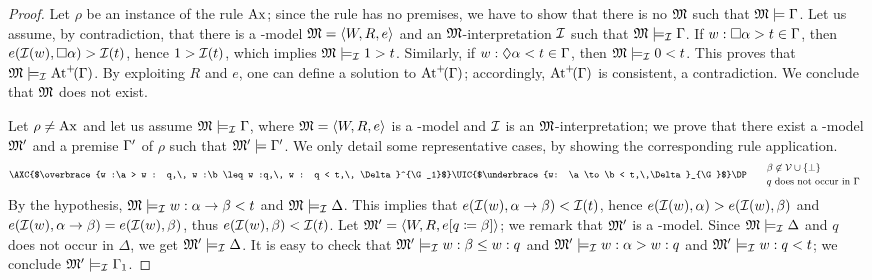 \begin{proof}
  Let $\rho$ be an instance of the rule $\mathrm{Ax}$; since the rule has no premises,
  we have to show that there is no $\mathfrak{M}$ such that $\mathfrak{M}\models \Gamma$.  Let
  us assume, by contradiction, that there is a \GWM-model
  $\mathfrak{M}=\langle W,R,e \rangle$ and an $\mathfrak{M}$-interpretation $\mathcal{I}$ such that
  $\mathfrak{M}\models_{\mathcal{I}} \Gamma$.  If $ w : \Box \alpha > t \in \Gamma$, then
  $e(\mathcal{I}(w), \Box \alpha) > \mathcal{I}(t)$, hence $1 > \mathcal{I}(t)$, which
  implies $\mathfrak{M}\models_{\mathcal{I}} 1 > t$.  Similarly, if $ w : \lozenge \alpha < t
  \in \Gamma$, then $\mathfrak{M}\models_{\mathcal{I}} 0 < t$.  This proves that
  $\mathfrak{M}\models_{\mathcal{I}} \mathrm{At}^{+}\!(\Gamma)$.  By exploiting $R$ and $e$, one can
  define a solution to $\mathrm{At}^{+}\!(\Gamma)$;
  accordingly, $\mathrm{At}^{+}\!(\Gamma)$ is consistent, a contradiction.  We
  conclude that $\mathfrak{M}$ does not exist. %

  Let $\rho\neq \mathrm{Ax}$ and let us assume $\mathfrak{M}\models_{\mathcal{I}}\Gamma$,
  where $\mathfrak{M}=\langle W,R,e \rangle$ is a \GWM-model and $\mathcal{I}$ is an
  $\mathfrak{M}$-interpretation; we prove that there exist a \GWM-model $\mathfrak{M}'$
  and a premise $\Gamma'$ of $\rho$ such that $\mathfrak{M}'\models\Gamma'$.  We only
  detail some representative cases, by showing the corresponding rule
  application.
  \[\small
  \AXC{$\overbrace{w :\a > w : q,\,  w :\b \leq w :q,\,  w : q  < t,\,  \Delta}^{\G_1}$}    
  \RightLabel{$\to <$}
  \UIC{$\underbrace{w: \a\to \b < t,\,\Delta}_{\G}$}
  \DP
  \qquad
  \begin{minipage}{10em}
    $\b\not\in \Vcal\cup\{\bot\}$
    \\[.5ex]
    $q$ does not occur in $\G$
  \end{minipage}
  \]
  By the hypothesis,  $\mathfrak{M}\models_{\mathcal{I}} w: \alpha\to \beta < t$
  and $\mathfrak{M}\models_{\mathcal{I}} \Delta$.  This implies that $e(\mathcal{I}(w), \alpha\to
  \beta) < \mathcal{I}(t)$, hence $e(\mathcal{I}(w),\alpha) > e(\mathcal{I}(w),\beta)$ and
  $e(\mathcal{I}(w),\alpha\to \beta) = e(\mathcal{I}(w),\beta)$, thus
$e(\mathcal{I}(w),\beta) < \mathcal{I}(t)$. 
Let   $\mathfrak{M}'=\langle W,R,e[q \coloneqq \beta] \rangle$;
we remark  that $\mathfrak{M}'$ is a \GWM-model.
  Since $\mathfrak{M}\models_{\mathcal{I}} \Delta$ and $q$ does not occur in
  $\Delta$, we get $\mathfrak{M}'\models_{\mathcal{I}} \Delta$.  It is easy to check that
  $\mathfrak{M}'\models_{\mathcal{I}} w :\beta \leq w:q$ and $\mathfrak{M}'\models_{\mathcal{I}} w :\alpha >
  w:q$ and $\mathfrak{M}'\models_{\mathcal{I}} w:q < t$; we conclude $\mathfrak{M}'\models_{\mathcal{I}}
  \Gamma_1$.


\end{proof}
